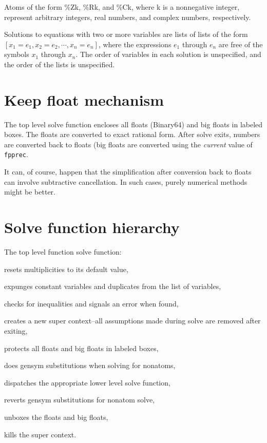 \documentclass[]{article}%
\newcommand{\fpprec}{\texttt{fpprec}}
\begin{document}






Atoms of the form \%Zk, \%Rk, and \%Ck, where k is a nonnegative integer, represent arbitrary integers, real numbers, and complex numbers, respectively.

Solutions to equations with two or more variables are lists of lists of the form \([x_1 = e_1, x_2 = e_2, \cdots, x_n = e_n] \), where the expressions \(e_1\) through \(e_n\) are free of the symbols \(x_1\) through \(x_n \). The order of variables in each solution is unspecified, and the order of the lists is unspecified.

\section{Keep float mechanism}

The top level solve function encloses all floats (Binary64) and big floats in labeled boxes. The floats are converted to exact rational form.
After solve exits, numbers are converted back to floats (big floats are converted using the \emph{current} value of \fpprec.

It can, of course, happen that the simplification after conversion back to floats can involve subtractive cancellation. In such cases, purely numerical methods might be better.

\section{Solve function hierarchy}

 The top level function solve function:
 \begin{alphalist}[noitemsep]
   \item resets multiplicities to its default value,
   \item expunges constant variables and duplicates from the list of variables,
   \item checks for inequalities and signals an error when found,
   \item creates a new super context--all assumptions made during solve are removed after exiting,
   \item protects all floats and big floats in labeled boxes,
   \item does gensym substitutions when solving for nonatoms,
   \item dispatches the appropriate lower level solve function,
   \item reverts gensym substitutions for nonatom solve,
   \item unboxes the floats and big floats,
   \item kills the super context.
\end{alphalist}
\end{document}
